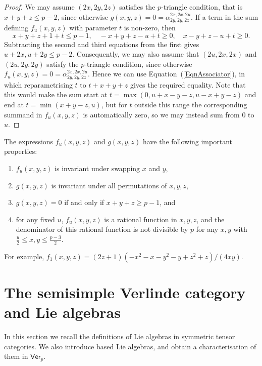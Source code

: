\documentclass[11pt,a4paper,reqno]{amsart}
\theoremstyle{definition}
\numberwithin{equation}{section}
\newcommand{\Ver}{\mathsf{Ver}}
\begin{document}
\begin{proof}
We may assume $(2x,2y,2z)$ satisfies the $p$-triangle condition, that is $x+y+z\leq p-2$, since otherwise $g(x,y,z)=0=\alpha^{2x,2x,2u}_{2y,2y,2z}$. If a term in the sum defining $f_u(x,y,z)$ with parameter $t$ is non-zero, then
\[x+y+z+1+t\leq p-1,\quad -x+y+z-u+t\geq0,\quad x-y+z-u+t\geq0.\]
Subtracting the second and third equations from the first gives $u+2x,u+2y\leq p-2$. Consequently, we may also assume that $(2u,2x,2x)$ and $(2u,2y,2y)$ satisfy the $p$-triangle condition, since otherwise $f_u(x,y,z)=0=\alpha^{2x,2x,2u}_{2y,2y,2z}$. Hence we can use Equation~(\ref{EqnAssociator}), in which reparametrising $t$ to $t+x+y+z$ gives the required equality. Note that this would make the sum start at $t=\max(0,u+x-y-z,u-x+y-z)$ and end at $t=\min(x+y-z,u)$, but for $t$ outside this range the corresponding summand in $f_u(x,y,z)$ is automatically zero, so we may instead sum from $0$ to $u$.
\end{proof}

The expressions $f_u(x,y,z)$ and $g(x,y,z)$ have the following important properties:
\begin{enumerate}
\item $f_u(x,y,z)$ is invariant under swapping $x$ and $y$,
\item $g(x,y,z)$ is invariant under all permutations of $x,y,z$,
\item $g(x,y,z)=0$ if and only if $x+y+z\geq p-1$, and
\item for any fixed $u$, $f_u(x,y,z)$ is a rational function in $x,y,z$, and the denominator of this rational function is not divisible by $p$ for any $x,y$ with $\frac u2\leq x,y\leq\frac{p-3}2$.
\end{enumerate}
For example, $f_1(x,y,z)=(2z+1)(-x^2-x-y^2-y+z^2+z)/(4xy)$.



\section{The semisimple Verlinde category and Lie algebras}\label{SecLieAlgs}

In this section we recall the definitions of Lie algebras in symmetric tensor categories. We also introduce based Lie algebras, and obtain a characterisation of them in $\Ver_p$.
\end{document}
